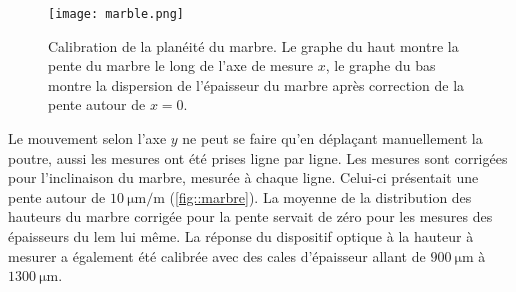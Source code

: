           \begin{figure}[!htb]
            \centering
            \texttt{[image: marble.png]}
            \caption[Calibration du système de mesure CCI]{\label{fig::marbre}Calibration de la planéité du marbre. Le graphe du haut montre la pente du marbre le long de l'axe de mesure $x$, le graphe du bas montre la dispersion de l'épaisseur du marbre après correction de la pente autour de $x=0$.}
          \end{figure}
          Le mouvement selon l'axe $y$ ne peut se faire qu'en déplaçant manuellement la poutre, aussi les mesures ont été prises ligne par ligne. Les mesures sont corrigées pour l'inclinaison du marbre, mesurée à chaque ligne. Celui-ci présentait une pente autour de $\SI{10}{\micro\meter\per\meter}$ (\autoref{fig::marbre}). La moyenne de la distribution des hauteurs du marbre corrigée pour la pente servait de zéro pour les mesures des épaisseurs du \gls{lem} lui même. La réponse du dispositif optique à la hauteur à mesurer a également été calibrée avec des cales d'épaisseur allant de $\SI{900}{\micro\meter}$ à $\SI{1300}{\micro\meter}$.
          
